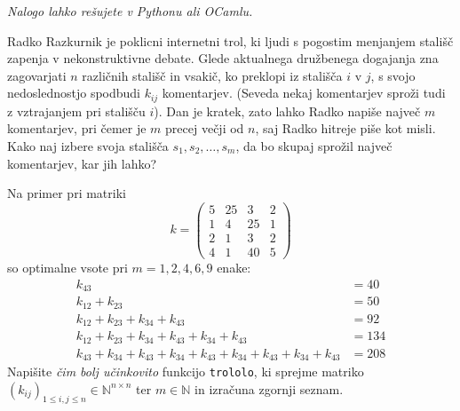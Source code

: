 \documentclass[arhiv]{../izpit}
\begin{document}
\emph{Nalogo lahko rešujete v Pythonu ali OCamlu.}

\noindent
Radko Razkurnik je poklicni internetni trol, ki ljudi s pogostim menjanjem stališč zapenja v nekonstruktivne debate. Glede aktualnega družbenega dogajanja zna zagovarjati $n$ različnih stališč in vsakič, ko preklopi iz stališča $i$ v $j$, s svojo nedoslednostjo spodbudi $k_{ij}$ komentarjev. (Seveda nekaj komentarjev sproži tudi z vztrajanjem pri stališču $i$). Dan je kratek, zato lahko Radko napiše največ $m$ komentarjev, pri čemer je $m$ precej večji od $n$, saj Radko hitreje piše kot misli. Kako naj izbere svoja stališča $s_1, s_2, \dots, s_m$, da bo skupaj sprožil največ komentarjev, kar jih lahko?

Na primer pri matriki
\[
  k = \begin{pmatrix}
    5 & 25 & 3 & 2 \\
    1 & 4 & 25 & 1 \\
    2 & 1 & 3 & 2 \\
    4 & 1 & 40 & 5
  \end{pmatrix}
\]
so optimalne vsote pri $m = 1, 2, 4, 6, 9$ enake:
\begin{align*}
  k_{43} &= 40 \\
  k_{12} + k_{23} &= 50 \\
  k_{12} + k_{23} + k_{34} + k_{43} &= 92 \\
  k_{12} + k_{23} + k_{34} + k_{43} + k_{34} + k_{43} &= 134 \\
  k_{43} + k_{34} + k_{43} + k_{34} + k_{43} + k_{34} + k_{43} + k_{34} + k_{43} &= 208
\end{align*}
Napišite \emph{čim bolj učinkovito} funkcijo \verb|trololo|, ki sprejme matriko $(k_{ij})_{1 \le i, j \le n} \in \mathbb{N}^{n \times n}$ ter $m \in \mathbb{N}$ in izračuna zgornji seznam.
\end{document}
